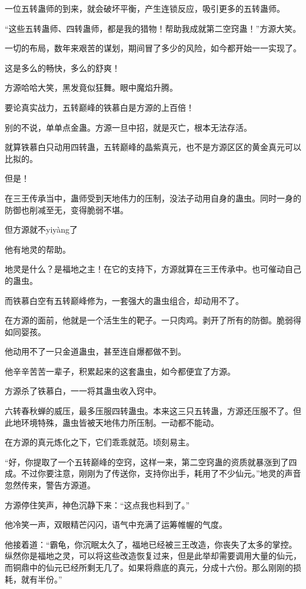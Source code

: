 \begin{this_body}
一位五转蛊师的到来，就会破坏平衡，产生连锁反应，吸引更多的五转蛊师。

“这些五转蛊师、四转蛊师，都是我的猎物！帮助我成就第二空窍蛊！”方源大笑。

一切的布局，数年来艰苦的谋划，期间冒了多少的风险，如今都开始一一实现了。

这是多么的畅快，多么的舒爽！

方源哈哈大笑，黑发竟似狂舞。眼中魔焰升腾。

要论真实战力，五转巅峰的铁慕白是方源的上百倍！

别的不说，单单点金蛊。方源一旦中招，就是灭亡，根本无法存活。

就算铁慕白只动用四转蛊，五转巅峰的晶紫真元，也不是方源区区的黄金真元可以比拟的。

但是！

在三王传承当中，蛊师受到天地伟力的压制，没法子动用自身的蛊虫。同时一身的防御也削减至无，变得脆弱不堪。

但方源就不yiyàng了

他有地灵的帮助。

地灵是什么？是福地之主！在它的支持下，方源就算在三王传承中。也可催动自己的蛊虫。

而铁慕白空有五转巅峰修为，一套强大的蛊虫组合，却动用不了。

在方源的面前，他就是一个活生生的靶子。一只肉鸡。剥开了所有的防御。脆弱得如同婴孩。

他动用不了一只金道蛊虫，甚至连自爆都做不到。

他辛辛苦苦一辈子，积累起来的这套蛊虫，如今都便宜了方源。

方源杀了铁慕白，一一将其蛊虫收入窍中。

六转春秋蝉的威压，最多压服四转蛊虫。本来这三只五转蛊，方源还压服不了。但此地环境特殊，蛊虫皆被天地伟力所压制。一动都不能动。

在方源的真元炼化之下，它们乖乖就范。顷刻易主。

“好，你提取了一个五转巅峰的空窍，这样一来，第二空窍蛊的资质就暴涨到了四成。不过你要注意，刚刚为了传送你，支持你出手，耗用了不少仙元。”地灵的声音忽然传来，警告方源道。

方源停住笑声，神色沉静下来：“这点我也料到了。”

他冷笑一声，双眼精芒闪闪，语气中充满了运筹帷幄的气度。

他接着道：“霸龟，你沉眠太久了，福地已经被三王改造，你丧失了太多的掌控。纵然你是福地之灵，可以将这些改造恢复过来，但是此举却需要调用大量的仙元，而铜鼎中的仙元已经所剩无几了。如果将鼎底的真元，分成十六份。那么刚刚的损耗，就有半份。”


\end{this_body}
